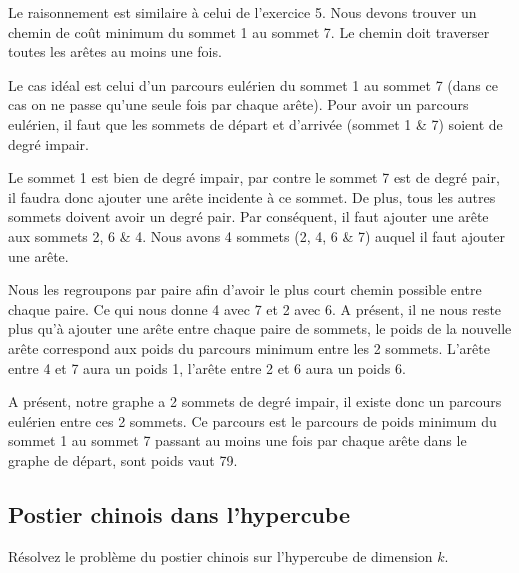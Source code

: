 \begin{solution}
Le raisonnement est similaire à celui de l'exercice 5. Nous devons
trouver un chemin de coût minimum du sommet 1 au sommet 7. Le chemin
doit traverser toutes les arêtes au moins une fois. 

Le cas idéal est celui d'un parcours eulérien du sommet 1 au sommet 7 (dans ce cas
on ne passe qu'une seule fois par chaque arête). Pour avoir un parcours
eulérien, il faut que les sommets de départ et d'arrivée (sommet 1
\& 7) soient de degré impair. 

Le sommet 1 est bien de degré impair,
par contre le sommet 7 est de degré pair, il faudra donc ajouter une
arête incidente à ce sommet. De plus, tous les autres sommets doivent
avoir un degré pair. Par conséquent, il faut ajouter une arête aux
sommets 2, 6 \& 4. Nous avons 4 sommets (2, 4, 6 \& 7) auquel il faut
ajouter une arête. 

Nous les regroupons par paire afin d'avoir le plus
court chemin possible entre chaque paire. Ce qui nous donne 4 avec
7 et 2 avec 6. A présent, il ne nous reste plus qu'à ajouter une arête
entre chaque paire de sommets, le poids de la nouvelle arête correspond
aux poids du parcours minimum entre les 2 sommets. L'arête entre 4
et 7 aura un poids 1, l'arête entre 2 et 6 aura un poids 6. 

A présent, notre graphe a 2 sommets de degré impair, il existe donc un parcours
eulérien entre ces 2 sommets. Ce parcours est le parcours de poids
minimum du sommet 1 au sommet 7 passant au moins une fois par chaque
arête dans le graphe de départ, sont poids vaut 79.
\end{solution}

\subsection{Postier chinois dans l'hypercube} Résolvez le problème du postier chinois sur l'hypercube de dimension $k$.
